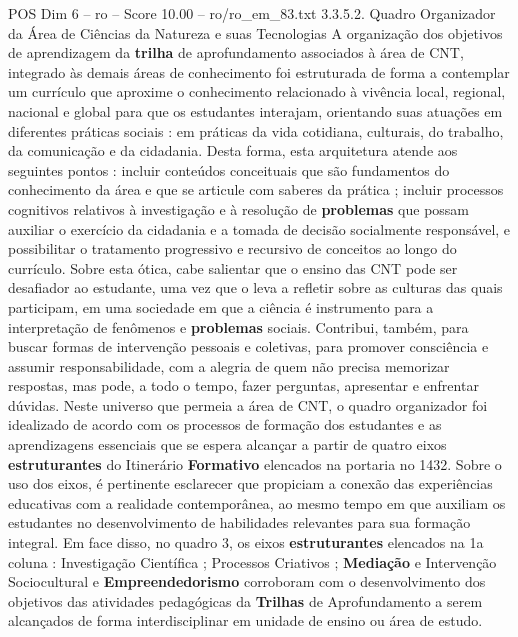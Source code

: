 \begin{textsample}{POS Dim 6 – ro – Score 10.00 – ro/ro\_em\_83.txt}  \label{ex:f6_pos_137}
3.3.5.2.
Quadro Organizador da Área de Ciências da Natureza e suas Tecnologias A organização dos objetivos de aprendizagem da \textbf{trilha} de aprofundamento associados à área de CNT, integrado às demais áreas de conhecimento foi estruturada de forma a contemplar um currículo que aproxime o conhecimento relacionado à vivência local, regional, nacional e global para que os estudantes interajam, orientando suas atuações em diferentes práticas sociais : em práticas da vida cotidiana, culturais, do trabalho, da comunicação e da cidadania.
Desta forma, esta arquitetura atende aos seguintes pontos : incluir conteúdos conceituais que são fundamentos do conhecimento da área e que se articule com saberes da prática ; incluir processos cognitivos relativos à investigação e à resolução de \textbf{problemas} que possam auxiliar o exercício da cidadania e a tomada de decisão socialmente responsável, e possibilitar o tratamento progressivo e recursivo de conceitos ao longo do currículo.
Sobre esta ótica, cabe salientar que o ensino das CNT pode ser desafiador ao estudante, uma vez que o leva a refletir sobre as culturas das quais participam, em uma sociedade em que a ciência é instrumento para a interpretação de fenômenos e \textbf{problemas} sociais.
Contribui, também, para buscar formas de intervenção pessoais e coletivas, para promover consciência e assumir responsabilidade, com a alegria de quem não precisa memorizar respostas, mas pode, a todo o tempo, fazer perguntas, apresentar e enfrentar dúvidas.
Neste universo que permeia a área de CNT, o quadro organizador foi idealizado de acordo com os processos de formação dos estudantes e as aprendizagens essenciais que se espera alcançar a partir de quatro eixos \textbf{estruturantes} do Itinerário \textbf{Formativo} elencados na portaria no 1432.
Sobre o uso dos eixos, é pertinente esclarecer que propiciam a conexão das experiências educativas com a realidade contemporânea, ao mesmo tempo em que auxiliam os estudantes no desenvolvimento de habilidades relevantes para sua formação integral.
Em face disso, no quadro 3, os eixos \textbf{estruturantes} elencados na 1a coluna : Investigação Científica ; Processos Criativos ; \textbf{Mediação} e Intervenção Sociocultural e \textbf{Empreendedorismo} corroboram com o desenvolvimento dos objetivos das atividades pedagógicas da \textbf{Trilhas} de Aprofundamento a serem alcançados de forma interdisciplinar em unidade de ensino ou área de estudo.

\end{textsample}
